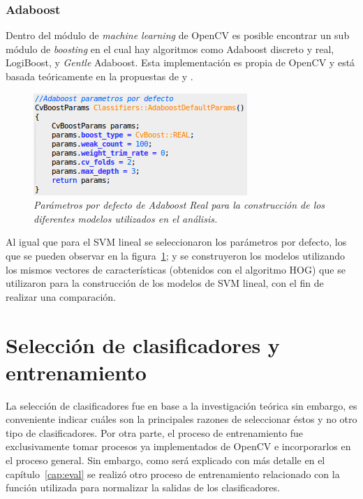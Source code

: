 \subsubsection{Adaboost}
\label{propuestas:adaboost}

Dentro del módulo de \textit{machine learning} de OpenCV es posible encontrar un sub módulo de \textit{boosting} en el cual hay algoritmos como Adaboost discreto y real, LogiBoost, y \textit{Gentle} Adaboost. Esta implementación es propia de OpenCV y está basada teóricamente en la propuestas de \cite{Hastie2005} y \cite{Friedman2000}.


\begin{figure}[H]
  \centering
  \includegraphics[scale=.6]{images/boostparams}
  \caption{\em Parámetros por defecto de Adaboost Real para la construcción de los diferentes modelos utilizados en el análisis.  }  
  \label{fig:boostparams}
\end{figure}

Al igual que para el SVM lineal se seleccionaron los parámetros por defecto, los que se pueden observar en la figura~\ref{fig:boostparams}; y se construyeron los modelos utilizando los mismos vectores de características (obtenidos con el algoritmo HOG) que se utilizaron para la construcción de los modelos de SVM lineal, con el fin de realizar una comparación.

\section{Selección de clasificadores y entrenamiento}
\label{clasificadores:seleccion}

La selección de clasificadores fue en base a la investigación teórica sin embargo, es conveniente indicar cuáles son la principales razones de seleccionar éstos y no otro tipo de clasificadores. Por otra parte, el proceso de entrenamiento fue exclusivamente tomar procesos ya implementados de OpenCV e incorporarlos en el proceso general. Sin embargo, como será explicado con más detalle en el capítulo~\ref{cap:eval} se realizó otro proceso de entrenamiento relacionado con la función utilizada para normalizar la salidas de los clasificadores.

